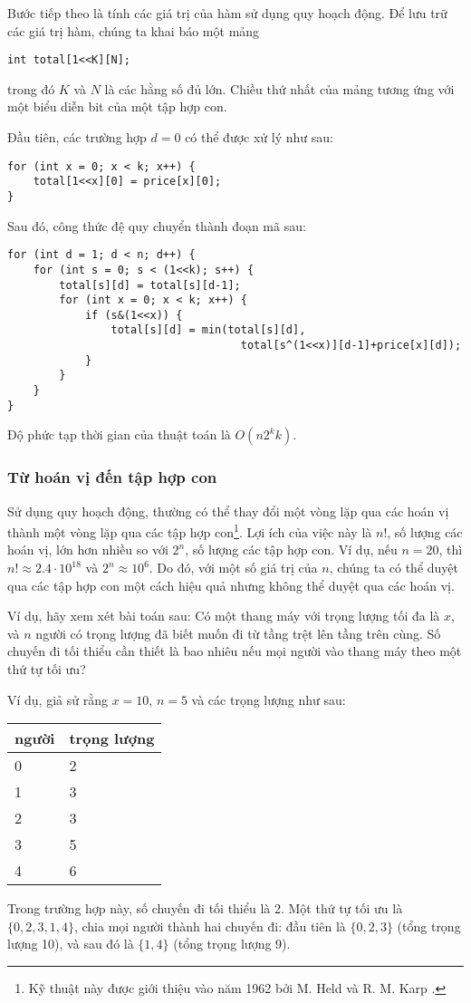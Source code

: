 Bước tiếp theo là tính các giá trị của hàm
sử dụng quy hoạch động.
Để lưu trữ các giá trị hàm, chúng ta khai báo một mảng
\begin{lstlisting}
int total[1<<K][N];
\end{lstlisting}
trong đó $K$ và $N$ là các hằng số đủ lớn.
Chiều thứ nhất của mảng tương ứng với một
biểu diễn bit của một tập hợp con.

Đầu tiên, các trường hợp $d=0$ có thể được xử lý như sau:
\begin{lstlisting}
for (int x = 0; x < k; x++) {
    total[1<<x][0] = price[x][0];
}
\end{lstlisting}
Sau đó, công thức đệ quy chuyển thành đoạn mã sau:
\begin{lstlisting}
for (int d = 1; d < n; d++) {
    for (int s = 0; s < (1<<k); s++) {
        total[s][d] = total[s][d-1];
        for (int x = 0; x < k; x++) {
            if (s&(1<<x)) {
                total[s][d] = min(total[s][d],
                                    total[s^(1<<x)][d-1]+price[x][d]);
            }
        }
    }
}
\end{lstlisting}
Độ phức tạp thời gian của thuật toán là $O(n 2^k k)$.

\subsubsection{Từ hoán vị đến tập hợp con}

Sử dụng quy hoạch động, thường có thể
thay đổi một vòng lặp qua các hoán vị thành
một vòng lặp qua các tập hợp con\footnote{Kỹ thuật này được giới thiệu vào năm 1962
bởi M. Held và R. M. Karp \cite{hel62}.}.
Lợi ích của việc này là
$n!$, số lượng các hoán vị,
lớn hơn nhiều so với $2^n$, số lượng các tập hợp con.
Ví dụ, nếu $n=20$, thì
$n! \approx 2.4 \cdot 10^{18}$ và $2^n \approx 10^6$.
Do đó, với một số giá trị của $n$,
chúng ta có thể duyệt qua các tập hợp con một cách hiệu quả nhưng không thể duyệt qua các hoán vị.

Ví dụ, hãy xem xét bài toán sau:
Có một thang máy với trọng lượng tối đa là $x$,
và $n$ người có trọng lượng đã biết
muốn đi từ tầng trệt
lên tầng trên cùng.
Số chuyến đi tối thiểu cần thiết là bao nhiêu
nếu mọi người vào thang máy theo một thứ tự tối ưu?

Ví dụ, giả sử rằng $x=10$, $n=5$
và các trọng lượng như sau:
\begin{center}
\begin{tabular}{ll}
người & trọng lượng \\
\hline
0 & 2 \\
1 & 3 \\
2 & 3 \\
3 & 5 \\
4 & 6 \\
\end{tabular}
\end{center}
Trong trường hợp này, số chuyến đi tối thiểu là 2.
Một thứ tự tối ưu là $\{0,2,3,1,4\}$,
chia mọi người thành hai chuyến đi:
đầu tiên là $\{0,2,3\}$ (tổng trọng lượng 10),
và sau đó là $\{1,4\}$ (tổng trọng lượng 9).

